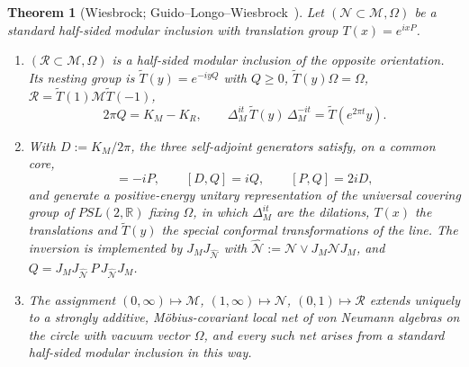 \documentclass[a4paper,11pt]{article}
\newtheorem{theorem}{Theorem}
\theoremstyle{definition}
\begin{document}
\begin{theorem}[Wiesbrock; Guido--Longo--Wiesbrock~{\cite{Wiesbrock1993b,GuidoLongoWiesbrock1998}}]\label{thm:wiesbrock-PSL}
Let $(\mathcal N\subset\mathcal M,\Omega)$ be a standard half-sided modular inclusion with translation group $T(x)=e^{ixP}$.
\begin{enumerate}
 \item[\rm(i)] $(\mathcal R\subset\mathcal M,\Omega)$ is a half-sided modular inclusion of the opposite orientation. Its nesting group is $\widetilde T(y)=e^{-iyQ}$ with $Q\ge0$, $\widetilde T(y)\Omega=\Omega$, $\mathcal R=\widetilde T(1)\mathcal M\widetilde T(-1)$,
 \begin{equation}
  2\pi Q=K_M-K_R,
  \qquad
  \Delta_M^{it}\,\widetilde T(y)\,\Delta_M^{-it}=\widetilde T(e^{2\pi t}y).
  \label{eq:HSMI-Q}
 \end{equation}
 \item[\rm(ii)] With $D:=K_M/2\pi$, the three self-adjoint generators satisfy, on a common core,
 \begin{equation}
  [D,P]=-iP,\qquad [D,Q]=iQ,\qquad [P,Q]=2iD,
  \label{eq:sl2-relations}
 \end{equation}
 and generate a positive-energy unitary representation of the universal covering group of $PSL(2,\mathbb R)$ fixing $\Omega$, in which $\Delta_M^{it}$ are the dilations, $T(x)$ the translations and $\widetilde T(y)$ the special conformal transformations of the line. The inversion is implemented by $J_MJ_{\widehat{\mathcal N}}$ with $\widehat{\mathcal N}:=\mathcal N\vee J_M\mathcal NJ_M$, and $Q=J_MJ_{\widehat{\mathcal N}}\,P\,J_{\widehat{\mathcal N}}J_M$.
 \item[\rm(iii)] The assignment $(0,\infty)\mapsto\mathcal M$, $(1,\infty)\mapsto\mathcal N$, $(0,1)\mapsto\mathcal R$ extends uniquely to a strongly additive, M\"obius-covariant local net of von Neumann algebras on the circle with vacuum vector $\Omega$, and every such net arises from a standard half-sided modular inclusion in this way.
\end{enumerate}
\end{theorem}
\end{document}
